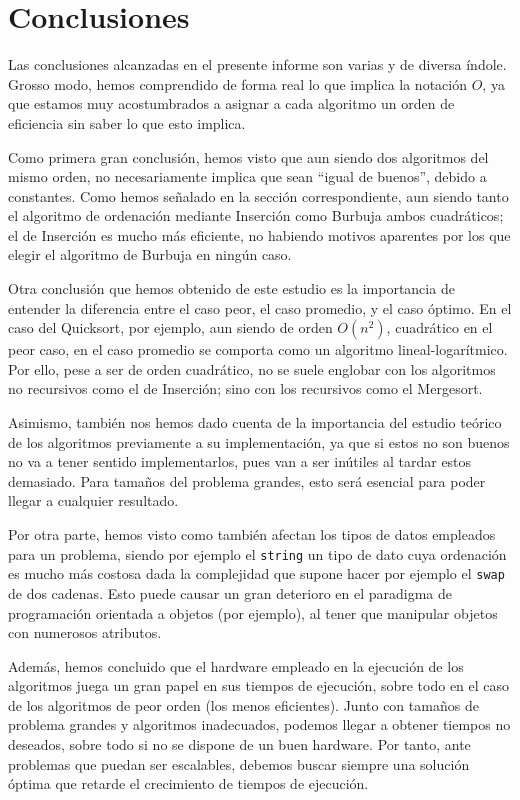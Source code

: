 \documentclass[12pt]{article}
\begin{document}
    \section{Conclusiones}
    
    Las conclusiones alcanzadas en el presente informe son varias y de diversa índole. Grosso modo, hemos comprendido de forma real lo que implica la notación $O$, ya que estamos muy acostumbrados a asignar a cada algoritmo un orden de eficiencia sin saber lo que esto implica.

    Como primera gran conclusión, hemos visto que aun siendo dos algoritmos del mismo orden, no necesariamente implica que sean ``igual de buenos'', debido a constantes. Como hemos señalado en la sección correspondiente, aun siendo tanto el algoritmo de ordenación mediante Inserción como Burbuja ambos cuadráticos; el de Inserción es mucho más eficiente, no habiendo motivos aparentes por los que elegir el algoritmo de Burbuja en ningún caso.

    Otra conclusión que hemos obtenido de este estudio es la importancia de entender la diferencia entre el caso peor, el caso promedio, y el caso óptimo. En el caso del Quicksort, por ejemplo, aun siendo de orden $O(n^2)$, cuadrático en el peor caso, en el caso promedio se comporta como un algoritmo lineal-logarítmico. Por ello, pese a ser de orden cuadrático, no se suele englobar con los algoritmos no recursivos como el de Inserción; sino con los recursivos como el Mergesort.

    Asimismo, también nos hemos dado cuenta de la importancia del estudio teórico de los algoritmos previamente a su implementación, ya que si estos no son buenos no va a tener sentido implementarlos, pues van a ser inútiles al tardar estos demasiado. Para tamaños del problema grandes, esto será esencial para poder llegar a cualquier resultado.

    Por otra parte, hemos visto como también afectan los tipos de datos empleados para un problema, siendo por ejemplo el \verb|string| un tipo de dato cuya ordenación es mucho más costosa dada la complejidad que supone hacer por ejemplo el \verb|swap| de dos cadenas. Esto puede causar un gran deterioro en el paradigma de programación orientada a objetos (por ejemplo), al tener que manipular objetos con numerosos atributos. 

    Además, hemos concluido que el hardware empleado en la ejecución de los algoritmos juega un gran papel en sus tiempos de ejecución, sobre todo en el caso de los algoritmos de peor orden (los menos eficientes). Junto con tamaños de problema grandes y algoritmos inadecuados, podemos llegar a obtener tiempos no deseados, sobre todo si no se dispone de un buen hardware. Por tanto, ante problemas que puedan ser escalables, debemos buscar siempre una solución óptima que retarde el crecimiento de tiempos de ejecución.
\end{document}
